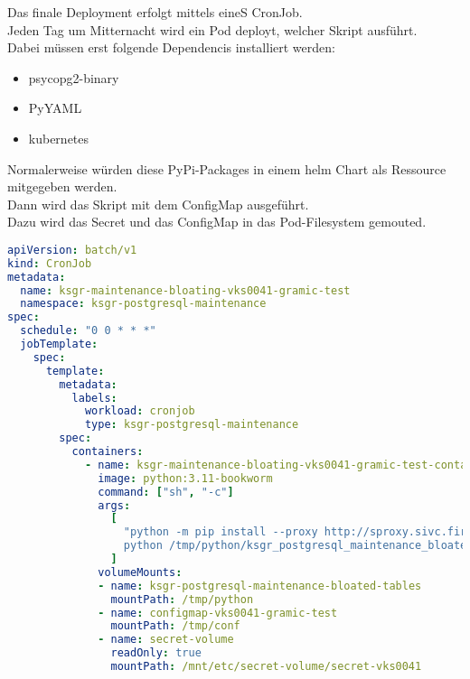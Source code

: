 \begin{flushleft}
    Das finale Deployment erfolgt mittels eineS CronJob.\\
    Jeden Tag um Mitternacht wird ein Pod deployt, welcher Skript ausführt.\\
    Dabei müssen erst folgende Dependencis installiert werden:
    \begin{itemize}
        \item psycopg2-binary
        \item PyYAML
        \item kubernetes
    \end{itemize}
    Normalerweise würden diese PyPi-Packages in einem \gls{helm} Chart als Ressource mitgegeben werden.\\
    Dann wird das Skript mit dem ConfigMap ausgeführt.\\
    Dazu wird das Secret und das ConfigMap in das Pod-Filesystem gemouted.
    \lstset{style=gra_codestyle}
    \begin{lstlisting}[language=yaml, caption=Maintenance-Tool - Bloated Tables / Indices - ksgr-maintenance-bloating-vks0041-gramic-test,captionpos=b,label={lst:maintenannce-tool-bloated-tables-ksgr-maintenance-bloating-vks0041-gramic-test},breaklines=true]
apiVersion: batch/v1
kind: CronJob
metadata:
  name: ksgr-maintenance-bloating-vks0041-gramic-test
  namespace: ksgr-postgresql-maintenance
spec:
  schedule: "0 0 * * *"
  jobTemplate:
    spec:
      template:
        metadata:
          labels:
            workload: cronjob
            type: ksgr-postgresql-maintenance
        spec:
          containers:
            - name: ksgr-maintenance-bloating-vks0041-gramic-test-container
              image: python:3.11-bookworm
              command: ["sh", "-c"]
              args:
                [
                  "python -m pip install --proxy http://sproxy.sivc.first-it.ch:8080 psycopg2-binary PyYAML kubernetes;
                  python /tmp/python/ksgr_postgresql_maintenance_bloated_tables.py /tmp/conf/configmap-vks0041-gramic-test.yaml"
                ]
              volumeMounts:
              - name: ksgr-postgresql-maintenance-bloated-tables
                mountPath: /tmp/python
              - name: configmap-vks0041-gramic-test
                mountPath: /tmp/conf
              - name: secret-volume
                readOnly: true
                mountPath: /mnt/etc/secret-volume/secret-vks0041


\end{lstlisting}
\end{flushleft}
